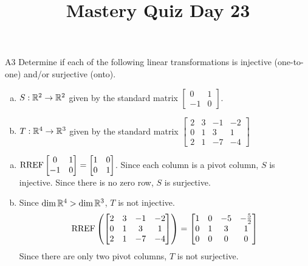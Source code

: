 \documentclass{sbgLAquiz}
\title{Mastery Quiz Day 23 }
\begin{document}
\begin{problem}{A3}
Determine if each of the following linear transformations is injective (one-to-one) and/or surjective (onto).
\begin{enumerate}[(a)]
\item $S: \mathbb{R}^2 \rightarrow \mathbb{R}^2$ given by the standard matrix $\begin{bmatrix} 0 & 1 \\ -1 & 0 \end{bmatrix}$.
\item $T: \mathbb{R}^4 \rightarrow \mathbb{R}^3$ given by the standard matrix $\begin{bmatrix} 2 & 3 & -1 & -2 \\ 0 & 1 & 3 & 1 \\ 2 & 1 & -7 & -4 \end{bmatrix}$
\end{enumerate}
\end{problem}
\begin{solution}
\begin{enumerate}[(a)]
\item $ \operatorname{RREF}\begin{bmatrix} 0 & 1 \\ -1 & 0 \end{bmatrix}=\begin{bmatrix}1 & 0 \\ 0 & 1 \end{bmatrix}$.  Since each column is a pivot column, $S$ is injective.  Since there is no zero row, $S$ is surjective.
\item Since $\dim \mathbb{R}^4 > \dim \mathbb{R}^3$, $T$ is not injective.
$$\operatorname{RREF}\left(\begin{bmatrix} 2 & 3 & -1 & -2 \\ 0 & 1 & 3 & 1 \\ 2 & 1 & -7 & -4 \end{bmatrix}\right) = \begin{bmatrix} 1 & 0 & -5 & -\frac{5}{2} \\ 0 & 1 & 3 & 1 \\ 0 & 0 & 0 & 0\end{bmatrix}$$
Since there are only two pivot columns, $T$ is not surjective.
\end{enumerate}
\end{solution}
\end{document}
